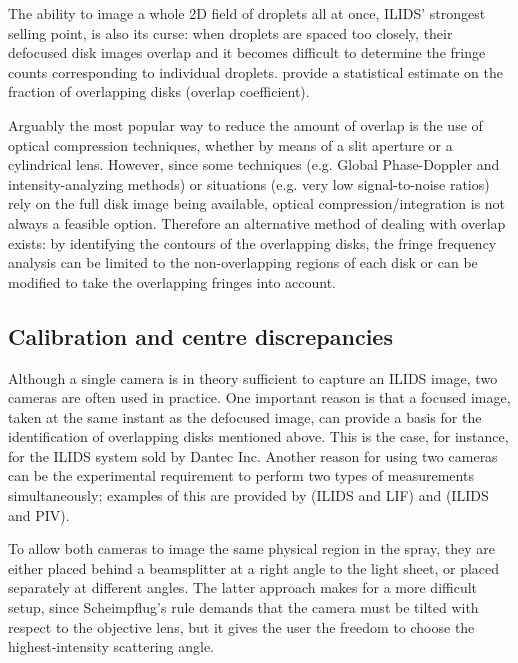 \documentclass[floatfix,aip,rsi,reprint,graphicx]{revtex4-1}
\begin{document}
The ability to image a whole 2D field of droplets all at once, ILIDS' strongest
selling point, is also its curse: when droplets are spaced too closely, their
defocused disk images overlap and it becomes difficult to determine the fringe counts
corresponding to individual droplets. \citet{Damaschke02} provide a statistical
estimate on the fraction of overlapping disks (overlap coefficient).

Arguably the most popular way to reduce the amount of overlap is the use of
optical compression techniques, whether by means of a slit aperture\cite{Pan06}
or a cylindrical lens\cite{Kawaguchi02, Maeda02}. However, since some techniques
(e.g. Global Phase-Doppler\cite{Damaschke01} and intensity-analyzing
methods\cite{Querel10}) or situations (e.g. very low signal-to-noise ratios)
rely on the full disk image being available, optical compression/integration is
not always a feasible option. Therefore an alternative method of dealing with
overlap exists: by identifying the contours of the overlapping disks, the 
fringe frequency analysis can be limited to the non-overlapping regions of each
disk or can be modified to take the overlapping fringes into account.

\subsection{Calibration and centre discrepancies}

Although a single camera is in theory sufficient to capture an ILIDS image, two
cameras are often used in practice. One important reason is that a focused
image, taken at the same instant as the defocused image, can provide a basis for
the identification of overlapping disks mentioned above. This is the case, for
instance, for the ILIDS system sold by Dantec Inc. Another reason for using two
cameras can be the experimental requirement to perform two types of measurements
simultaneously; examples of this are provided by \citet{Hardalupas10a} (ILIDS
and LIF) and \citet{Hardalupas10} (ILIDS and PIV).

To allow both cameras to image the same physical region in the spray, they are
either placed behind a beamsplitter at a right angle to the light sheet, or
placed separately at different angles. The latter approach makes for a more
difficult setup, since Scheimpflug's rule demands that the camera must be tilted
with respect to the objective lens, but it gives the user the freedom to choose
the highest-intensity scattering angle.
\end{document}
